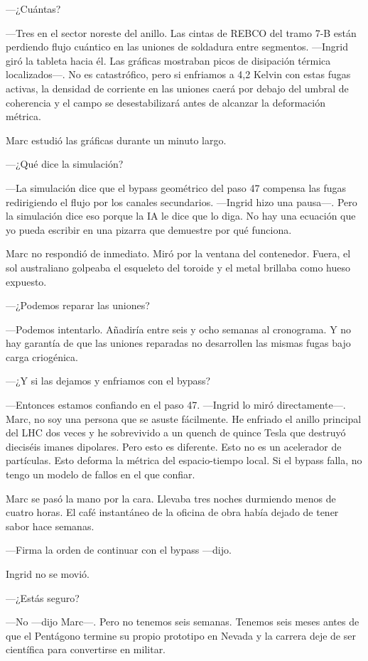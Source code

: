 \documentclass[11pt,a5paper,twoside]{book}
\begin{document}
—¿Cuántas?

—Tres en el sector noreste del anillo. Las cintas de REBCO del tramo 7-B están perdiendo flujo cuántico en las uniones de soldadura entre segmentos. —Ingrid giró la tableta hacia él. Las gráficas mostraban picos de disipación térmica localizados—. No es catastrófico, pero si enfriamos a 4,2 Kelvin con estas fugas activas, la densidad de corriente en las uniones caerá por debajo del umbral de coherencia y el campo se desestabilizará antes de alcanzar la deformación métrica.

Marc estudió las gráficas durante un minuto largo.

—¿Qué dice la simulación?

—La simulación dice que el bypass geométrico del paso 47 compensa las fugas redirigiendo el flujo por los canales secundarios. —Ingrid hizo una pausa—. Pero la simulación dice eso porque la IA le dice que lo diga. No hay una ecuación que yo pueda escribir en una pizarra que demuestre por qué funciona.

Marc no respondió de inmediato. Miró por la ventana del contenedor. Fuera, el sol australiano golpeaba el esqueleto del toroide y el metal brillaba como hueso expuesto.

—¿Podemos reparar las uniones?

—Podemos intentarlo. Añadiría entre seis y ocho semanas al cronograma. Y no hay garantía de que las uniones reparadas no desarrollen las mismas fugas bajo carga criogénica.

—¿Y si las dejamos y enfriamos con el bypass?

—Entonces estamos confiando en el paso 47. —Ingrid lo miró directamente—. Marc, no soy una persona que se asuste fácilmente. He enfriado el anillo principal del LHC dos veces y he sobrevivido a un quench de quince Tesla que destruyó dieciséis imanes dipolares. Pero esto es diferente. Esto no es un acelerador de partículas. Esto deforma la métrica del espacio-tiempo local. Si el bypass falla, no tengo un modelo de fallos en el que confiar.

Marc se pasó la mano por la cara. Llevaba tres noches durmiendo menos de cuatro horas. El café instantáneo de la oficina de obra había dejado de tener sabor hace semanas.

—Firma la orden de continuar con el bypass —dijo.

Ingrid no se movió.

—¿Estás seguro?

—No —dijo Marc—. Pero no tenemos seis semanas. Tenemos seis meses antes de que el Pentágono termine su propio prototipo en Nevada y la carrera deje de ser científica para convertirse en militar.
\end{document}
